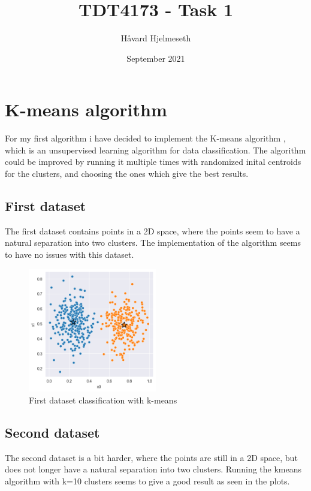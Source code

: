 \documentclass{article}
\title{TDT4173  - Task 1}
\author{Håvard Hjelmeseth}
\date{September 2021}
\begin{document}
\maketitle

\section{K-means algorithm}
For my first algorithm i have decided to implement the K-means algorithm
, which is an unsupervised learning algorithm for data classification. The
algorithm could be improved by running it multiple times with randomized
inital centroids for the clusters, and choosing the ones which give the 
best results.

\subsection{First dataset}
The first dataset contains points in a 2D space, where the points seem to have
a natural separation into two clusters. The implementation of the algorithm
seems to have no issues with this dataset.

\begin{figure}[!h]
    \centering
    \includegraphics[width=0.5\textwidth]{kmeans_data1.png}
    \caption{First dataset classification with k-means}
    \label{fig:dataset1}
\end{figure}

\subsection{Second dataset}

The second dataset is a bit harder, where the points are still in a 2D space,
but does not longer have a natural separation into two clusters. Running the kmeans
algorithm with k=10 clusters seems to give a good result as seen in the plots.
\end{document}
